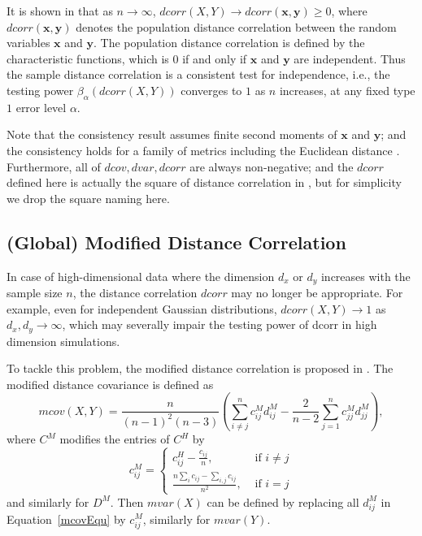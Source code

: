 \documentclass[11pt]{article}
\providecommand{\mb}[1]{\boldsymbol{#1}}
\begin{document}
It is shown in \cite{SzekelyRizzoBakirov2007} that as $n \rightarrow \infty$, $dcorr(X,Y) \rightarrow dcorr(\mb{x},\mb{y}) \geq 0$, where $dcorr(\mb{x},\mb{y})$ denotes the population distance correlation between the random variables $\mb{x}$ and $\mb{y}$. The population distance correlation is defined by the characteristic functions, which is $0$ if and only if $\mb{x}$ and $\mb{y}$ are independent. Thus the sample distance correlation is a consistent test for independence, i.e., the testing power $\beta_{\alpha}(dcorr(X,Y))$ converges to $1$ as $n$ increases, at any fixed type $1$ error level $\alpha$. 

Note that the consistency result assumes finite second moments of $\mb{x}$ and $\mb{y}$; and the consistency holds for a family of metrics including the Euclidean distance \cite{Lyons2013}. Furthermore, all of $dcov, dvar, dcorr$ are always non-negative; and the $dcorr$ defined here is actually the square of distance correlation in \cite{SzekelyRizzoBakirov2007}, but for simplicity we drop the square naming here.

\subsection{(Global) Modified Distance Correlation}
\label{appen:mcorr}
In case of high-dimensional data where the dimension $d_{x}$ or $d_{y}$ increases with the sample size $n$, the distance correlation $dcorr$ may no longer be appropriate. For example, even for independent Gaussian distributions, $dcorr(X,Y) \rightarrow 1$ as $d_{x}, d_{y} \rightarrow \infty$, which may severally impair the testing power of dcorr in high dimension simulations.

To tackle this problem, the modified distance correlation is proposed in \cite{SzekelyRizzo2013a}. The modified distance covariance is defined as
\begin{equation}
\label{mcovEqu}
mcov(X,Y)=\frac{n}{(n-1)^2(n-3)}(\sum_{i \neq j}^{n}c^{M}_{ij}d^{M}_{ij}-\frac{2}{n-2}\sum_{j=1}^{n}c^{M}_{jj}d^{M}_{jj}),
\end{equation}
where $C^{M}$ modifies the entries of $C^{H}$ by
\[c^{M}_{ij} = \left\{
  \begin{array}{lr}
    c^{H}_{ij}-\frac{c_{ij}}{n}, & \mbox{ if } i \neq j \\
    \frac{n\sum_{i}c_{ij}-\sum_{i,j}c_{ij}}{n^2}, &\mbox{ if } i = j 
  \end{array}
\right.
\]
and similarly for $D^{M}$. Then $mvar(X)$ can be defined by replacing all $d^{M}_{ij}$ in Equation~\eqref{mcovEqu} by $c^{M}_{ij}$, similarly for $mvar(Y)$. 
\end{document}
